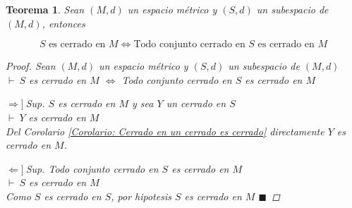 \documentclass[oneside]{book} %
\theoremstyle{Teorema}
\newtheorem{Teorema}[Definicion]{Teorema}
\theoremstyle{Ejemplos}
\theoremstyle{[Obs]}
\renewcommand{\{}{\left\lbrace} %
\renewcommand{\}}{\right\rbrace} %
\renewcommand{\qed}{$\blacksquare$} %
\newcommand{\pd}{$\vdash\ $} %
\newcommand{\necesidad}{$\Rightarrow]\ $} %
\newcommand{\suficiencia}{$\Leftarrow]\ $} %
\begin{document}
			\begin{Teorema}\setlength{\parindent}{0em}
			
				Sean $(M, d)$ un espacio métrico y $(S, d)$ un subespacio de $(M, d)$, entonces 

				\[ S \text{ es cerrado en } M \Leftrightarrow \text{Todo conjunto cerrado en } S \text{ es cerrado en } M \]

				\begin{proof}
					
					Sean $(M, d)$ un espacio métrico y $(S, d)$ un subespacio de $(M, d)$ \\ 
					\pd $S$ es cerrado en $M$ $\Leftrightarrow$ Todo conjunto cerrado en $S$ es cerrado en $M$ 
					
					\necesidad Sup. $S$ es cerrado en $M$ y sea $Y$ un cerrado en $S$ \\ 
					\pd $Y$ es cerrado en $M$ \\ 
					Del Corolario \ref{Corolario: Cerrado en un cerrado es cerrado} directamente $Y$ es cerrado en $M$. 

					\suficiencia Sup. Todo conjunto cerrado en $S$ es cerrado en $M$ \\ 
					\pd $S$ es cerrado en $M$ \\ 
					Como $S$ es cerrado en $S$, por hipotesis $S$ es cerrado en $M$ \qed

				\end{proof}
			
			\end{Teorema}
\end{document}
